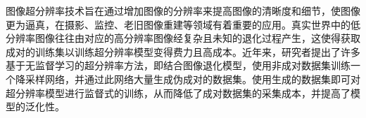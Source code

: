 


图像超分辨率技术旨在通过增加图像的分辨率来提高图像的清晰度和细节，使图像更为逼真，在摄影、监控、老旧图像重建等领域有着重要的应用。真实世界中的低分辨率图像往往由对应的高分辨率图像经复杂且未知的退化过程产生，这使得获取成对的训练集以训练超分辨率模型变得费力且高成本。近年来，研究者提出了许多基于无监督学习的超分辨率方法，即结合图像退化模型，使用非成对数据集训练一个降采样网络，并通过此网络大量生成伪成对的数据集。使用生成的数据集即可对超分辨率模型进行监督式的训练，从而降低了成对数据集的采集成本，并提高了模型的泛化性。

